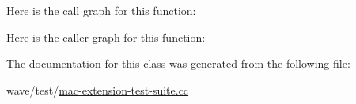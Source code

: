 Here is the call graph for this function\+:




Here is the caller graph for this function\+:




The documentation for this class was generated from the following file\+:\begin{DoxyCompactItemize}
\item 
wave/test/\hyperlink{mac-extension-test-suite_8cc}{mac-\/extension-\/test-\/suite.\+cc}\end{DoxyCompactItemize}
